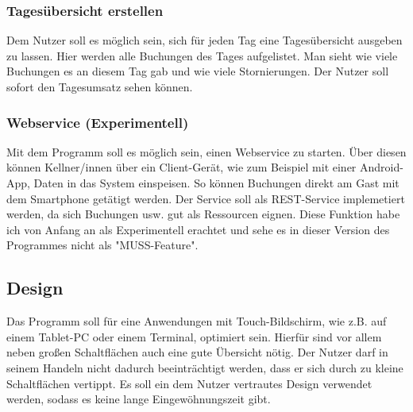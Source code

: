 \subsubsection{Tagesübersicht erstellen}

Dem Nutzer soll es möglich sein, sich für jeden Tag eine Tagesübersicht ausgeben zu lassen. Hier werden alle Buchungen des Tages aufgelistet. Man sieht wie viele Buchungen es an diesem Tag gab und wie viele Stornierungen. Der Nutzer soll sofort den Tagesumsatz sehen können.

\subsubsection{Webservice (Experimentell)}

Mit dem Programm soll es möglich sein, einen Webservice zu starten. Über diesen können Kellner/innen über ein Client-Gerät, wie zum Beispiel mit einer Android-App, Daten in das System einspeisen. So können Buchungen direkt am Gast mit dem Smartphone getätigt werden. Der Service soll als REST-Service implemetiert werden, da sich Buchungen usw. gut als Ressourcen eignen. Diese Funktion habe ich von Anfang an als Experimentell erachtet und sehe es in dieser Version des Programmes nicht als "MUSS-Feature".

\subsection{Design}

Das Programm soll für eine Anwendungen mit Touch-Bildschirm, wie z.B. auf einem Tablet-PC oder einem Terminal, optimiert sein. Hierfür sind vor allem neben großen Schaltflächen auch eine gute Übersicht nötig. Der Nutzer darf in seinem Handeln nicht dadurch beeinträchtigt werden, dass er sich durch zu kleine Schaltflächen vertippt. Es soll ein dem Nutzer vertrautes Design verwendet werden, sodass es keine lange Eingewöhnungszeit gibt. 